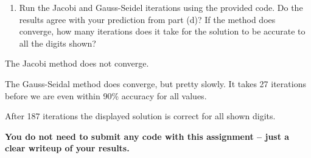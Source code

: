 \documentclass{article}
\begin{document}
\begin{enumerate}
\begin{enumerate}
\begin{mdframed}[style=MyFrame]
\end{mdframed}

\item Run the Jacobi and Gauss-Seidel iterations using the provided code. Do the results agree with your prediction from part (d)? If the method does converge, how many iterations does it take for the solution to be accurate to all the digits shown? \newline
\end{enumerate}

\begin{mdframed}[style=MyFrame]
The Jacobi method does not converge.

The Gauss-Seidal method does converge, but pretty slowly. It takes 27 iterations before we are even within 90\% accuracy for all values.

After 187 iterations the displayed solution is correct for all shown digits.

\end{mdframed}

{\bf You do not need to submit any code with this assignment -- just a clear writeup of your results.}
\end{enumerate}
\end{document}
